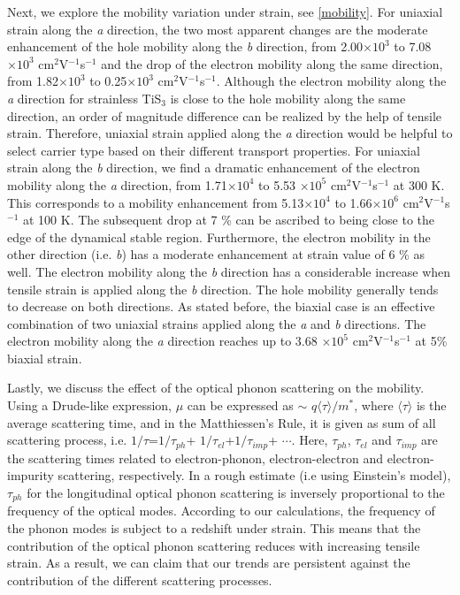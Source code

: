 Next, we explore the mobility variation under strain, see \autoref{mobility}. For uniaxial strain along the \textit{a} direction, the two most apparent changes are the moderate enhancement of the hole mobility along the \textit{b} direction, from 2.00$\times10^3$ to 7.08$\times10^3$ cm$^2$V$^{-1}$s$^{-1}$ and the drop of the electron mobility along the same direction, from 1.82$\times10^3$ to 0.25$\times10^3$ cm$^2$V$^{-1}$s$^{-1}$. Although the electron mobility along the \textit{a} direction for strainless TiS$_3$ is close to the hole mobility along the same direction, an order of magnitude difference can be realized by the help of tensile strain. Therefore,  uniaxial strain applied along the \textit{a} direction would be helpful to select carrier type based on their different transport properties.  For uniaxial strain along the \textit{b} direction, we find a dramatic enhancement of the electron mobility along the \textit{a} direction, from 1.71$\times10^4$  to 5.53 $\times10^5$ cm$^2$V$^{-1}$s$^{-1}$ at 300 K. This corresponds to a mobility enhancement from 5.13$\times10^4$ to 1.66$\times10^6$ cm$^2$V$^{-1}$s$^{-1}$ at 100 K. The subsequent drop at 7 \% can be ascribed to being close to the edge of the dynamical stable region. Furthermore, the electron mobility in the other direction (i.e. \textit{b}) has a moderate enhancement at strain value of 6 \% as well. The electron mobility along the \textit{b} direction has a considerable increase when tensile strain is applied along the \textit{b} direction. The hole mobility generally tends to decrease on both directions.  As stated before, the biaxial case is an effective combination of two uniaxial strains applied along the \textit{a} and \textit{b} directions. The electron mobility along the \textit{a} direction reaches up to  3.68 $\times10^5$ cm$^2$V$^{-1}$s$^{-1}$ at 5\% biaxial strain. 

Lastly, we discuss the effect of the optical phonon scattering on the mobility.  Using a Drude-like expression, $\mu$ can be expressed as  $\sim$ $q\langle\tau\rangle/m^*$, where $\langle\tau\rangle$ is the average scattering time, and in the Matthiessen's Rule, it is given as sum of all scattering process, i.e.  $1/\tau$=$1/\tau_{ph}$+ $1/\tau_{el}$+$1/\tau_{imp}$+ $\cdots$. Here, $\tau_{ph}$, $\tau_{el}$ and $\tau_{imp}$ are the scattering times related to electron-phonon, electron-electron and electron-impurity scattering, respectively.  In a rough estimate (i.e using Einstein's model), $\tau_{ph}$ for the longitudinal optical phonon scattering is inversely proportional  to the frequency of the optical modes. According to our calculations, the frequency of the phonon modes is subject to a redshift under strain. This means that the contribution of the optical phonon scattering reduces with increasing tensile strain.  As a result, we can claim that our trends are persistent against the contribution of the different scattering processes. 

